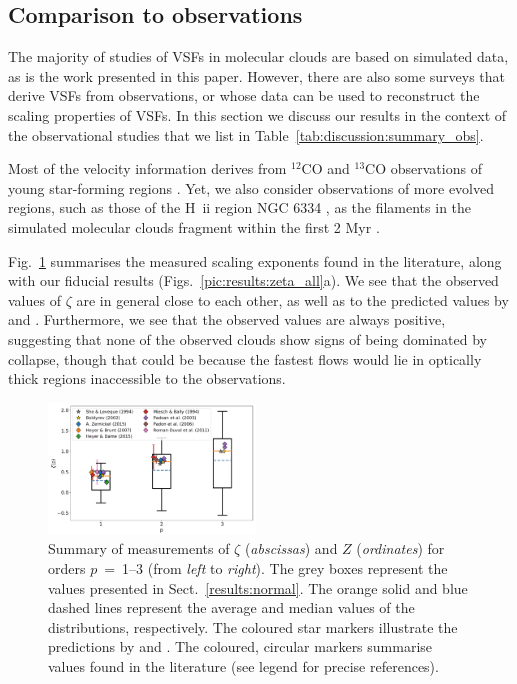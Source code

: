 \subsection{Comparison to observations}\label{discussion:observation}

The majority of studies of VSFs in molecular clouds are based on simulated data, as is the work presented in this paper.
However, there are also some surveys that derive VSFs from observations, or whose data can be used to reconstruct the scaling properties of VSFs. 
In this section we discuss our results in the context of the observational studies that we list in Table~\ref{tab:discussion:summary_obs}.



Most of the velocity information derives from $^{12}$CO and $^{13}$CO observations of young star-forming regions \citep[e.g., Perseus and Taurus][]{Padoan2003}.
Yet, we also consider observations of more evolved regions, such as those of the H~{\sc ii} region NGC 6334 \citep{Zernickel2015}, as the filaments in the simulated molecular clouds fragment within the first 2 Myr .

Fig.~\ref{pic:discussion:comp_observation} summarises the measured scaling exponents found in the literature, along with our fiducial results (Figs.~\ref{pic:results:zeta_all}a).
We see that the observed values of $\zeta$ are in general close to each other, as well as to the predicted values by \citet{She1994} and \citet{Boldyrev2002}. 
Furthermore, we see that the observed values are always positive, suggesting that none of the observed clouds show signs of being dominated by collapse, though that could be because the fastest flows would lie in optically thick regions inaccessible to the observations.  

\begin{figure}
	\includegraphics[width=0.49\textwidth]{compare_observations.pdf}
	\caption{Summary of measurements of $\zeta$ (\textit{abscissas}) and $Z$ (\textit{ordinates}) for orders $p$~=~1--3 (from \textit{left} to \textit{right}). The grey boxes represent the values presented in Sect.~\ref{results:normal}. The orange solid and blue dashed lines represent the average and median values of the distributions, respectively. The coloured star markers illustrate the predictions by \citet{She1994} and \citet{Boldyrev2002}. The coloured, circular markers summarise values found in the literature (see legend for precise references).
	}
	\label{pic:discussion:comp_observation}
\end{figure}


